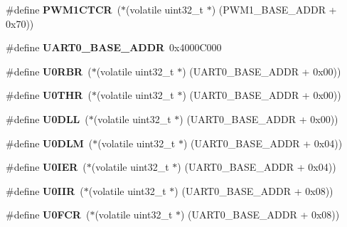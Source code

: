 \begin{DoxyCompactItemize}
\#define {\bfseries P\+W\+M1\+C\+T\+CR}~($\ast$(volatile uint32\+\_\+t $\ast$) (P\+W\+M1\+\_\+\+B\+A\+S\+E\+\_\+\+A\+D\+DR + 0x70))
\item 
\mbox{\label{group__lpc24xx__regs_gac1b34f5487c2e7f4905a1aeba9ba885b}} 
\#define {\bfseries U\+A\+R\+T0\+\_\+\+B\+A\+S\+E\+\_\+\+A\+D\+DR}~0x4000\+C000
\item 
\mbox{\label{group__lpc24xx__regs_ga2551368ffe3c25f7f7e902296e9c92c9}} 
\#define {\bfseries U0\+R\+BR}~($\ast$(volatile uint32\+\_\+t $\ast$) (U\+A\+R\+T0\+\_\+\+B\+A\+S\+E\+\_\+\+A\+D\+DR + 0x00))
\item 
\mbox{\label{group__lpc24xx__regs_gaa521905280aa0a96627769b804b8c51a}} 
\#define {\bfseries U0\+T\+HR}~($\ast$(volatile uint32\+\_\+t $\ast$) (U\+A\+R\+T0\+\_\+\+B\+A\+S\+E\+\_\+\+A\+D\+DR + 0x00))
\item 
\mbox{\label{group__lpc24xx__regs_ga2cbc2d5592327ef6365580a4e3add7f4}} 
\#define {\bfseries U0\+D\+LL}~($\ast$(volatile uint32\+\_\+t $\ast$) (U\+A\+R\+T0\+\_\+\+B\+A\+S\+E\+\_\+\+A\+D\+DR + 0x00))
\item 
\mbox{\label{group__lpc24xx__regs_ga0c1e0ad22e8f1f03914b31d64a3fed7d}} 
\#define {\bfseries U0\+D\+LM}~($\ast$(volatile uint32\+\_\+t $\ast$) (U\+A\+R\+T0\+\_\+\+B\+A\+S\+E\+\_\+\+A\+D\+DR + 0x04))
\item 
\mbox{\label{group__lpc24xx__regs_gad85c49db4d38e9a7a6ed2dc27ef57754}} 
\#define {\bfseries U0\+I\+ER}~($\ast$(volatile uint32\+\_\+t $\ast$) (U\+A\+R\+T0\+\_\+\+B\+A\+S\+E\+\_\+\+A\+D\+DR + 0x04))
\item 
\mbox{\label{group__lpc24xx__regs_ga31ceeca933d9ad729ee9d2bbd511a15f}} 
\#define {\bfseries U0\+I\+IR}~($\ast$(volatile uint32\+\_\+t $\ast$) (U\+A\+R\+T0\+\_\+\+B\+A\+S\+E\+\_\+\+A\+D\+DR + 0x08))
\item 
\mbox{\label{group__lpc24xx__regs_ga865a057f689e5260dd49f983f2e6554d}} 
\#define {\bfseries U0\+F\+CR}~($\ast$(volatile uint32\+\_\+t $\ast$) (U\+A\+R\+T0\+\_\+\+B\+A\+S\+E\+\_\+\+A\+D\+DR + 0x08))
\item 

\end{DoxyCompactItemize}
